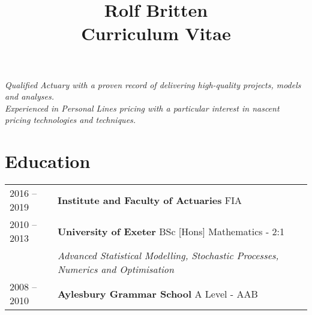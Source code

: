\documentclass[11pt]{article}
\title{\bfseries \Huge Rolf Britten \\ \Large Curriculum Vitae}
\date{}
\begin{document}
\vspace{-20mm}
\maketitle
\vspace{-20mm}

\begin{center} \emph{ Qualified Actuary with a proven record of delivering high-quality projects, models and analyses.\\Experienced in Personal Lines pricing with a particular interest in nascent pricing technologies and techniques.} \end{center}

\section*{Education}
\begin{tabular}{l | l l}
2016 -- 2019 & \textbf{Institute and Faculty of Actuaries} FIA \\
2010 -- 2013 & \textbf{University of Exeter} BSc [Hons] Mathematics - 2:1\\
& \hspace{4mm} \textit{Advanced Statistical Modelling, Stochastic Processes, Numerics and Optimisation }\\
2008 -- 2010 & \textbf{Aylesbury Grammar School} A Level - AAB \\
\end{tabular}
\end{document}
